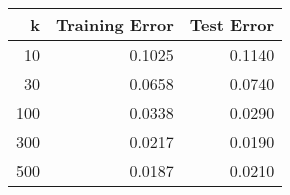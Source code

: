 \begin{tabular}{rrr}
\toprule
k & Training Error & Test Error \\
\midrule
10 & 0.1025 & 0.1140 \\
30 & 0.0658 & 0.0740 \\
100 & 0.0338 & 0.0290 \\
300 & 0.0217 & 0.0190 \\
500 & 0.0187 & 0.0210 \\
\bottomrule
\end{tabular}
